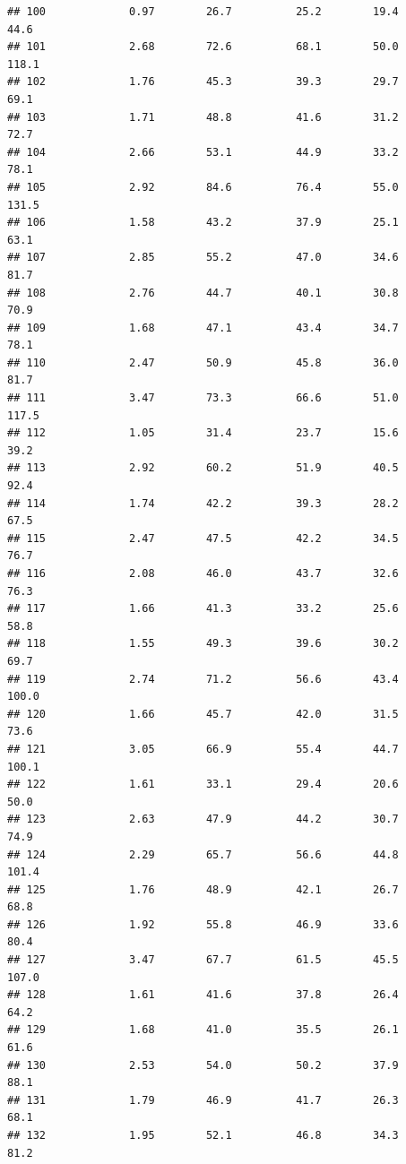 \documentclass[
]{book}
\theoremstyle{definition}
\theoremstyle{definition}
\theoremstyle{definition}
\theoremstyle{definition}
\theoremstyle{remark}
\begin{document}
\begin{verbatim}
## 100             0.97        26.7          25.2        19.4             44.6
## 101             2.68        72.6          68.1        50.0            118.1
## 102             1.76        45.3          39.3        29.7             69.1
## 103             1.71        48.8          41.6        31.2             72.7
## 104             2.66        53.1          44.9        33.2             78.1
## 105             2.92        84.6          76.4        55.0            131.5
## 106             1.58        43.2          37.9        25.1             63.1
## 107             2.85        55.2          47.0        34.6             81.7
## 108             2.76        44.7          40.1        30.8             70.9
## 109             1.68        47.1          43.4        34.7             78.1
## 110             2.47        50.9          45.8        36.0             81.7
## 111             3.47        73.3          66.6        51.0            117.5
## 112             1.05        31.4          23.7        15.6             39.2
## 113             2.92        60.2          51.9        40.5             92.4
## 114             1.74        42.2          39.3        28.2             67.5
## 115             2.47        47.5          42.2        34.5             76.7
## 116             2.08        46.0          43.7        32.6             76.3
## 117             1.66        41.3          33.2        25.6             58.8
## 118             1.55        49.3          39.6        30.2             69.7
## 119             2.74        71.2          56.6        43.4            100.0
## 120             1.66        45.7          42.0        31.5             73.6
## 121             3.05        66.9          55.4        44.7            100.1
## 122             1.61        33.1          29.4        20.6             50.0
## 123             2.63        47.9          44.2        30.7             74.9
## 124             2.29        65.7          56.6        44.8            101.4
## 125             1.76        48.9          42.1        26.7             68.8
## 126             1.92        55.8          46.9        33.6             80.4
## 127             3.47        67.7          61.5        45.5            107.0
## 128             1.61        41.6          37.8        26.4             64.2
## 129             1.68        41.0          35.5        26.1             61.6
## 130             2.53        54.0          50.2        37.9             88.1
## 131             1.79        46.9          41.7        26.3             68.1
## 132             1.95        52.1          46.8        34.3             81.2

\end{verbatim}
\end{document}
